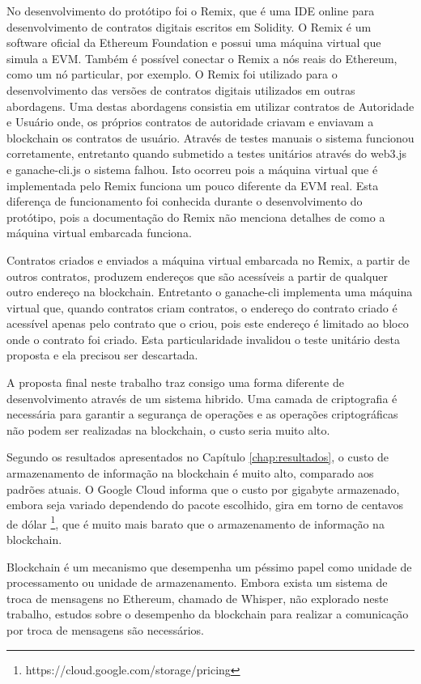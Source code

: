 \documentclass[tcc,capa]{texufpel}
\begin{document}
    No desenvolvimento do protótipo foi o Remix, que é uma IDE online para desenvolvimento de contratos digitais escritos em Solidity. O Remix é um software oficial da Ethereum Foundation e possui uma máquina virtual que simula a EVM. Também é possível conectar o Remix a nós reais do Ethereum, como um nó particular, por exemplo. O Remix foi utilizado para o desenvolvimento das versões de contratos digitais utilizados em outras abordagens. Uma destas abordagens consistia em utilizar contratos de Autoridade e Usuário onde, os próprios contratos de autoridade criavam e enviavam a blockchain os contratos de usuário. Através de testes manuais o sistema funcionou corretamente, entretanto quando submetido a testes unitários através do web3.js e ganache-cli.js o sistema falhou. Isto ocorreu pois a máquina virtual que é implementada pelo Remix funciona um pouco diferente da EVM real. Esta diferença de funcionamento foi conhecida durante o desenvolvimento do protótipo, pois a documentação do Remix não menciona detalhes de como a máquina virtual embarcada funciona.
    
    Contratos criados e enviados a máquina virtual embarcada no Remix, a partir de outros contratos, produzem endereços que são acessíveis a partir de qualquer outro endereço na blockchain. Entretanto o ganache-cli implementa uma máquina virtual que, quando contratos criam contratos, o endereço do contrato criado é acessível apenas pelo contrato que o criou, pois este endereço é limitado ao bloco onde o contrato foi criado. Esta particularidade invalidou o teste unitário desta proposta e ela precisou ser descartada.
    
    A proposta final neste trabalho traz consigo uma forma diferente de desenvolvimento através de um sistema hibrido. Uma camada de criptografia é necessária para garantir a segurança de operações e as operações criptográficas não podem ser realizadas na blockchain, o custo seria muito alto.
    
    Segundo os resultados apresentados no Capítulo \ref{chap:resultados}, o custo de armazenamento de informação na blockchain é muito alto, comparado aos padrões atuais. O Google Cloud informa que o custo por gigabyte armazenado, embora seja variado dependendo do pacote escolhido, gira em torno de centavos de dólar \footnote{https://cloud.google.com/storage/pricing}, que é muito mais barato que o armazenamento de informação na blockchain.
    
    Blockchain é um mecanismo que desempenha um péssimo papel como unidade de processamento ou unidade de armazenamento. Embora exista um sistema de troca de mensagens no Ethereum, chamado de Whisper, não explorado neste trabalho, estudos sobre o desempenho da blockchain para realizar a comunicação por troca de mensagens são necessários.
    
\end{document}

